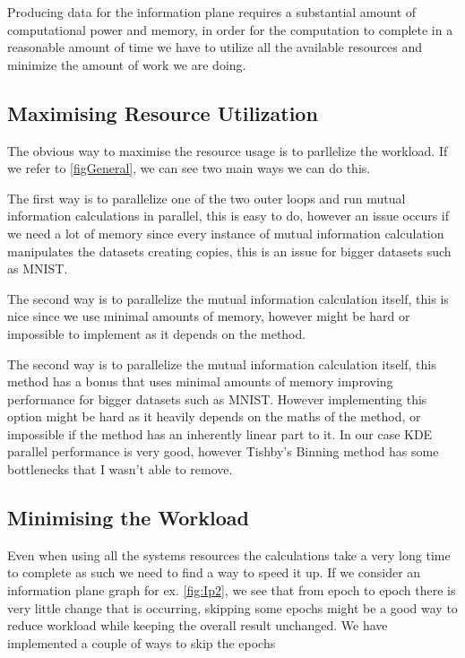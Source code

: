 \documentclass[dissertation.tex]{subfiles}
\begin{document}
Producing data for the information plane requires a substantial amount of
computational power and memory, in order for the computation to complete in a
reasonable amount of time we have to utilize all the available resources and
minimize the amount of work we are doing.

\subsection{Maximising Resource Utilization}

The obvious way to maximise the resource usage is to parllelize the workload.
If we refer to \autoref{figGeneral}, we can see two main ways we can do this.

The first way is to parallelize one of the two outer loops and run mutual
information calculations in parallel, this is easy to do, however an issue
occurs if we need a lot of memory since every instance of mutual information
calculation manipulates the datasets creating copies, this is an issue for
bigger datasets such as MNIST.

The second way is to parallelize the mutual information calculation itself, this
is nice since we use minimal amounts of memory, however might be hard or
impossible to implement as it depends on the method.

The second way is to parallelize the mutual information calculation itself, this
method has a  bonus that uses minimal amounts of memory improving performance
for bigger datasets such as MNIST. However implementing this option might be
hard as it heavily depends on the maths of the method, or impossible if the
method has an inherently linear part to it. In our case KDE parallel performance
is very good, however Tishby's Binning method has some bottlenecks that I
wasn't able to remove.

\subsection{Minimising the Workload}

Even when using all the systems resources the calculations take a very long
time to complete as such we need to find a way to speed it up. If we consider an
information plane graph for ex. \autoref{fig:Ip2}, we see that from epoch to
epoch there is very little change that is occurring, skipping some epochs might
be a good way to reduce workload while keeping the overall result unchanged. We
have implemented a couple of ways to skip the epochs 
\end{document}
